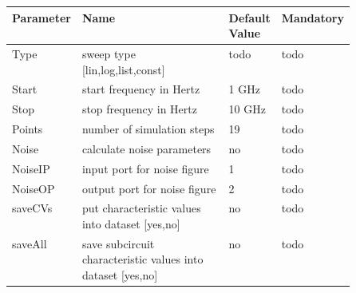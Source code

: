 \begin{tabular}{|l|p{0.5\linewidth}|l|l|}
\hline
Parameter & Name & Default Value & Mandatory \\
\hline
Type & sweep type [lin,log,list,const] & todo & todo \\
Start & start frequency in Hertz & 1 GHz & todo \\
Stop & stop frequency in Hertz & 10 GHz & todo \\
Points & number of simulation steps & 19 & todo \\
Noise & calculate noise parameters & no & todo \\
NoiseIP & input port for noise figure & 1 & todo \\
NoiseOP & output port for noise figure & 2 & todo \\
saveCVs & put characteristic values into dataset [yes,no] & no & todo \\
saveAll & save subcircuit characteristic values into dataset [yes,no] & no & todo \\
\hline
\end{tabular}





